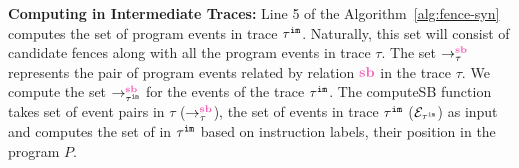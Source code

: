 
\noindent\textbf{Computing \lsb in Intermediate Traces:} 
Line 5 of the Algorithm~\ref{alg:fence-syn} computes the set of program 
events in trace $ {\tau}^{\mathtt{im}} $. Naturally, this set will consist of 
candidate fences along with all the program events in trace $ \tau $.
The set $ \setSB $ represents the pair of program events related by 
relation $ \lsb $ in the trace $ \tau $. We compute the set 
$ \seqb{\im{\tau}}{}{} $ for the events of the trace $ {\tau}^{\mathtt{im}} $. 
The computeSB function takes set of \lsb event pairs in $ \tau $ 
($ \setSB $), the set of events in trace $ {\tau}^{\mathtt{im}} $ 
($ \mathcal{E}_{{\tau}^{\mathtt{im}}} $) as input and computes the set of \lsb in 
$ {\tau}^{\mathtt{im}} $ based on instruction labels, their position in the program $ P $. 

